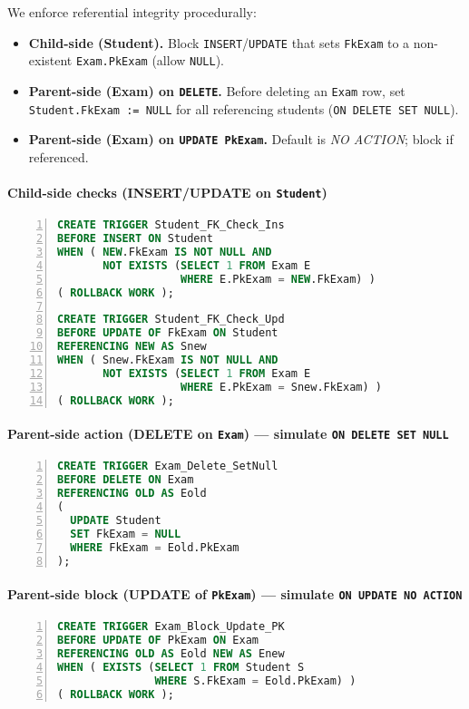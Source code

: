 \documentclass{article}
\begin{document}
\begin{subtasks}
We enforce referential integrity procedurally:
\begin{itemize}
  \item \textbf{Child-side (Student).} Block \texttt{INSERT}/\texttt{UPDATE} that sets \texttt{FkExam} to a non-existent \texttt{Exam.PkExam} (allow \texttt{NULL}).
  \item \textbf{Parent-side (Exam) on \texttt{DELETE}.} Before deleting an \texttt{Exam} row, set \texttt{Student.FkExam := NULL} for all referencing students (\texttt{ON DELETE SET NULL}).
  \item \textbf{Parent-side (Exam) on \texttt{UPDATE PkExam}.} Default is \emph{NO ACTION}; block if referenced.
\end{itemize}

\paragraph{Child-side checks (INSERT/UPDATE on \texttt{Student})}
\begin{lstlisting}[language=SQL,frame=single,numbers=left,numberstyle=\tiny]
CREATE TRIGGER Student_FK_Check_Ins
BEFORE INSERT ON Student
WHEN ( NEW.FkExam IS NOT NULL AND
       NOT EXISTS (SELECT 1 FROM Exam E
                   WHERE E.PkExam = NEW.FkExam) )
( ROLLBACK WORK );

CREATE TRIGGER Student_FK_Check_Upd
BEFORE UPDATE OF FkExam ON Student
REFERENCING NEW AS Snew
WHEN ( Snew.FkExam IS NOT NULL AND
       NOT EXISTS (SELECT 1 FROM Exam E
                   WHERE E.PkExam = Snew.FkExam) )
( ROLLBACK WORK );
\end{lstlisting}

\paragraph{Parent-side action (DELETE on \texttt{Exam}) — simulate \texttt{ON DELETE SET NULL}}
\begin{lstlisting}[language=SQL,frame=single,numbers=left,numberstyle=\tiny]
CREATE TRIGGER Exam_Delete_SetNull
BEFORE DELETE ON Exam
REFERENCING OLD AS Eold
(
  UPDATE Student
  SET FkExam = NULL
  WHERE FkExam = Eold.PkExam
);
\end{lstlisting}

\paragraph{Parent-side block (UPDATE of \texttt{PkExam}) — simulate \texttt{ON UPDATE NO ACTION}}
\begin{lstlisting}[language=SQL,frame=single,numbers=left,numberstyle=\tiny]
CREATE TRIGGER Exam_Block_Update_PK
BEFORE UPDATE OF PkExam ON Exam
REFERENCING OLD AS Eold NEW AS Enew
WHEN ( EXISTS (SELECT 1 FROM Student S
               WHERE S.FkExam = Eold.PkExam) )
( ROLLBACK WORK );
\end{lstlisting}


\end{subtasks}
\end{document}
